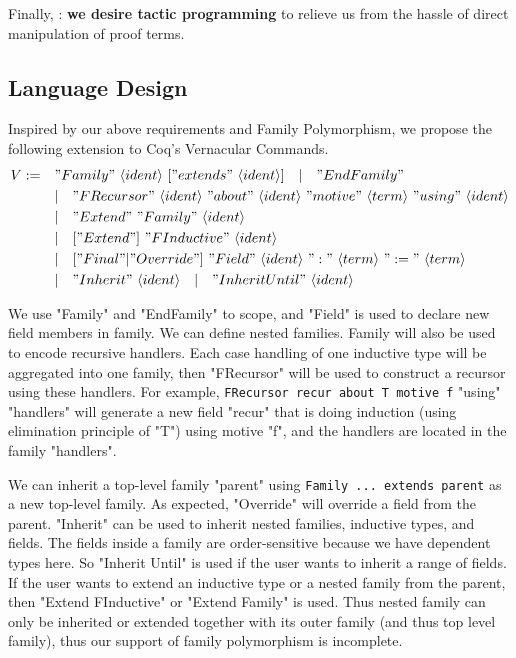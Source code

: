 Finally, : \textbf{we desire tactic
programming} to relieve us from the hassle of direct manipulation of proof terms.

\subsection{Language Design}
Inspired by our above requirements and Family Polymorphism, we propose
the following extension to Coq's Vernacular Commands.
\begin{align*}
  V := \quad &"Family"~\langle ident\rangle~["extends"~\langle ident\rangle] 
  \quad |\quad "EndFamily" \\
  & |\quad "FRecursor"~\langle ident\rangle~"about"~\langle ident\rangle~"motive"~\langle term\rangle~"using"~\langle ident\rangle \\
  & |\quad "Extend"~"Family"~\langle ident\rangle \\ 
  & |\quad ["Extend"]~"FInductive"~\langle ident\rangle \\ 
  & |\quad ["Final" | "Override"]~"Field"~\langle ident\rangle~":"~\langle term \rangle~":="~\langle term \rangle \\
  & | \quad "Inherit"~\langle ident\rangle \quad | \quad "Inherit Until"~\langle ident\rangle
\end{align*}

We use "Family" and "EndFamily" to scope, and "Field" is used to declare new field members in family.
We can define nested families.
Family will also be used to encode recursive handlers. Each case
handling of one inductive type will be aggregated into one family, then
"FRecursor" will be used to construct a recursor using these handlers.
For example, \texttt{FRecursor recur about T motive f} "using"
"handlers" will generate a new field "recur" that is doing induction
(using elimination principle of "T") using motive "f", and the handlers
are located in the family "handlers".

We can inherit a top-level family "parent" using \texttt{Family
... extends parent} as a new top-level family. As expected, "Override"
will override a field from the parent. "Inherit" can be used to inherit
nested families, inductive types, and fields. The fields inside a family
are order-sensitive because we have dependent types here. So "Inherit
Until" is used if the user wants to inherit a range of fields. If the
user wants to extend an inductive type or a nested family from the
parent, then "Extend FInductive" or "Extend Family" is used. Thus nested
family can only be inherited or extended together with its outer family
(and thus top level family), thus our support of family polymorphism is
incomplete.

